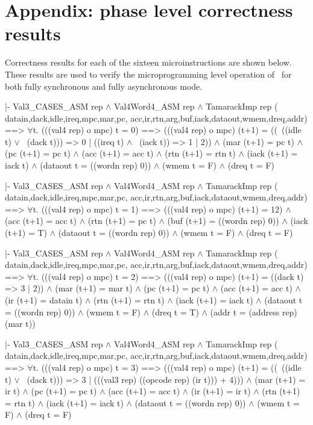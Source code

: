 \appendix

\section{Appendix: phase level correctness results}
\label{apx-phase}

Correctness results for each of the sixteen microinstructions
are shown below.  These results are used to
verify the microprogramming level operation of \Tamarack\ for
both fully synchronous and fully asynchronous mode.

\begintt
|- Val3_CASES_ASM rep \(\wedge\)
   Val4Word4_ASM rep \(\wedge\)
   TamarackImp rep (
     datain,dack,idle,ireq,mpc,mar,pc,
     acc,ir,rtn,arg,buf,iack,dataout,wmem,dreq,addr)
   ==>
   \(\forall\)t.
    (((val4 rep) o mpc) t = 0)
    ==>
    (((val4 rep) o mpc) (t+1) =
       ((~((idle t) \(\vee\) ~(dack t))) => 0 |
        ((ireq t) \(\wedge\) ~(iack t)) => 1 | 2)) \(\wedge\)
    (mar (t+1) = pc t) \(\wedge\)
    (pc (t+1) = pc t) \(\wedge\)
    (acc (t+1) = acc t) \(\wedge\)
    (rtn (t+1) = rtn t) \(\wedge\)
    (iack (t+1) = iack t) \(\wedge\)
    (dataout t = ((wordn rep) 0)) \(\wedge\)
    (wmem t = F) \(\wedge\)
    (dreq t = F)
\endtt

\begintt
|- Val3_CASES_ASM rep \(\wedge\)
   Val4Word4_ASM rep \(\wedge\)
   TamarackImp rep (
     datain,dack,idle,ireq,mpc,mar,pc,
     acc,ir,rtn,arg,buf,iack,dataout,wmem,dreq,addr)
   ==>
   \(\forall\)t.
    (((val4 rep) o mpc) t = 1)
    ==>
    (((val4 rep) o mpc) (t+1) = 12) \(\wedge\)
    (acc (t+1) = acc t) \(\wedge\)
    (rtn (t+1) = pc t) \(\wedge\)
    (buf (t+1) = ((wordn rep) 0)) \(\wedge\)
    (iack (t+1) = T) \(\wedge\)
    (dataout t = ((wordn rep) 0)) \(\wedge\)
    (wmem t = F) \(\wedge\)
    (dreq t = F)
\endtt
\newpage %


\begintt
|- Val3_CASES_ASM rep \(\wedge\)
   Val4Word4_ASM rep \(\wedge\)
   TamarackImp rep (
     datain,dack,idle,ireq,mpc,mar,pc,
     acc,ir,rtn,arg,buf,iack,dataout,wmem,dreq,addr)
   ==>
   \(\forall\)t.
    (((val4 rep) o mpc) t = 2)
    ==>
    (((val4 rep) o mpc) (t+1) = ((dack t) => 3 | 2)) \(\wedge\)
    (mar (t+1) = mar t) \(\wedge\)
    (pc (t+1) = pc t) \(\wedge\)
    (acc (t+1) = acc t) \(\wedge\)
    (ir (t+1) = datain t) \(\wedge\)
    (rtn (t+1) = rtn t) \(\wedge\)
    (iack (t+1) = iack t) \(\wedge\)
    (dataout t = ((wordn rep) 0)) \(\wedge\)
    (wmem t = F) \(\wedge\)
    (dreq t = T) \(\wedge\)
    (addr t = (address rep) (mar t))
\endtt

\begintt
|- Val3_CASES_ASM rep \(\wedge\)
   Val4Word4_ASM rep \(\wedge\)
   TamarackImp rep (
     datain,dack,idle,ireq,mpc,mar,pc,
     acc,ir,rtn,arg,buf,iack,dataout,wmem,dreq,addr)
   ==>
   \(\forall\)t.
    (((val4 rep) o mpc) t = 3)
    ==>
    (((val4 rep) o mpc) (t+1) =
       ((~((idle t) \(\vee\) ~(dack t))) => 3 |
         (((val3 rep) ((opcode rep) (ir t))) + 4))) \(\wedge\)
    (mar (t+1) = ir t) \(\wedge\)
    (pc (t+1) = pc t) \(\wedge\)
    (acc (t+1) = acc t) \(\wedge\)
    (ir (t+1) = ir t) \(\wedge\)
    (rtn (t+1) = rtn t) \(\wedge\)
    (iack (t+1) = iack t) \(\wedge\)
    (dataout t = ((wordn rep) 0)) \(\wedge\)
    (wmem t = F) \(\wedge\)
    (dreq t = F)
\endtt
\newpage %


